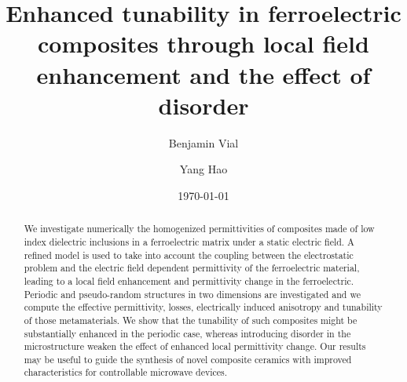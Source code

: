 \documentclass[%
 aip,
 amsmath,amssymb,
 reprint,%
]{revtex4-1}
\newcommand{\co}[1]{#1}
\begin{document}
\title{\co{Enhanced tunability in ferroelectric composites through local field enhancement and the effect of disorder}}
\author{Benjamin Vial}
\author{Yang Hao}

\date{\today}

%
%


%


\begin{abstract}
 We investigate \co{numerically} the homogenized permittivities of \co{composites} made of low index dielectric inclusions in a ferroelectric matrix under
 a static electric field. A refined model is used to take into account the coupling
 between the electrostatic problem and the electric field dependent permittivity of the
 ferroelectric material, leading to a local field enhancement and permittivity change in the ferroelectric.
 Periodic and pseudo-random structures in two dimensions are investigated and
 we \co{compute} the effective permittivity, losses, electrically induced anisotropy and tunability
 of those metamaterials. We show that the tunability of such composites might be substantially
 enhanced in the periodic case, \co{whereas} introducing disorder in the microstructure
 weaken the effect of enhanced local permittivity change. Our results may be useful to guide the synthesis of novel composite ceramics with improved characteristics for controllable microwave devices.
\end{abstract}

\maketitle
\end{document}
